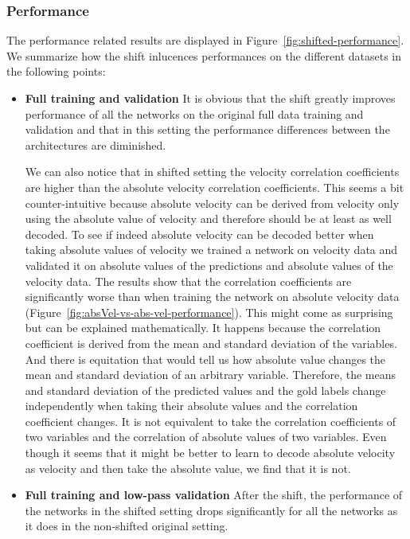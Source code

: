 \subsubsection{Performance}
The performance related results are displayed in Figure~\ref{fig:shifted-performance}.
We summarize how the shift inlucences performances on the different datasets in the following points:
\begin{itemize}
    \item \textbf{Full training and validation} It is obvious that the shift greatly improves performance of all the networks on the original full data training and validation and that in this setting the performance differences between the architectures are diminished.
    
    We can also notice that in shifted setting the velocity correlation coefficients are higher than the absolute velocity correlation coefficients. This seems a bit counter-intuitive because absolute velocity can be derived from velocity only using the absolute value of velocity and therefore should be at least as well decoded.
    To see if indeed absolute velocity can be decoded better when taking absolute values of velocity we trained a network on velocity data and validated it on absolute values of the predictions and absolute values of the velocity data.
    The results show that the correlation coefficients are significantly worse than when training the network on absolute velocity data (Figure~\ref{fig:absVel-vs-abs-vel-performance}). 
    This might come as surprising but can be explained mathematically. It happens because the correlation coefficient is derived from the mean and standard deviation of the variables. And there is equitation that would tell us how absolute value changes the mean and standard deviation of an arbitrary variable. Therefore, the means and standard deviation of the predicted values and the gold labels change independently when taking their absolute values and the correlation coefficient changes.
    It is not equivalent to take the correlation coefficients of two variables and the correlation of absolute values of two variables. 
    Even though it seems that it might be better to learn to decode absolute velocity as velocity and then take the absolute value, we find that it is not. 
    
    \item \textbf{Full training and low-pass validation} After the shift, the performance of the networks in the shifted setting drops significantly for all the networks as it does in the non-shifted original setting.
    

\end{itemize}
